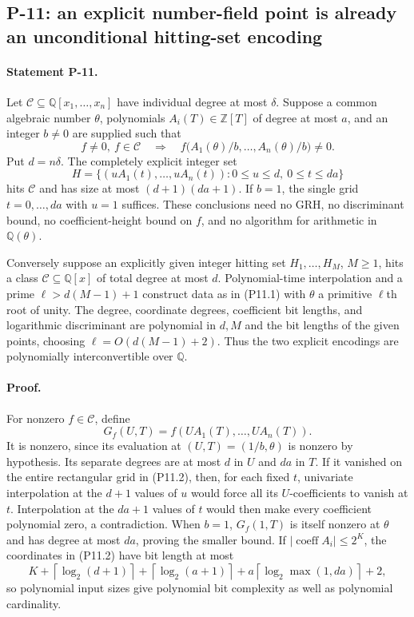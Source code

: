 \documentclass[11pt,a4paper]{article}
\theoremstyle{definition}\newtheorem{definition}{Definition}
\begin{document}
\subsection{P-11: an explicit number-field point is already an unconditional hitting-set encoding}
\paragraph{Statement P-11.}
Let $\mathcal C\subseteq\mathbb Q[x_1,\ldots,x_n]$ have individual degree at most $\delta$. Suppose a common algebraic number $\theta$, polynomials $A_i(T)\in\mathbb Z[T]$ of degree at most $a$, and an integer $b\ne0$ are supplied such that
\[
 f\ne0,\ f\in\mathcal C\quad\Longrightarrow\quad
 f\bigl(A_1(\theta)/b,\ldots,A_n(\theta)/b\bigr)\ne0.
 \tag{P11.1}
\]
Put $d=n\delta$. The completely explicit integer set
\[
 H=\{(uA_1(t),\ldots,uA_n(t)):
        0\le u\le d,\ 0\le t\le da\}
 \tag{P11.2}
\]
hits $\mathcal C$ and has size at most $(d+1)(da+1)$. If $b=1$, the single grid $t=0,\ldots,da$ with $u=1$ suffices. These conclusions need no GRH, no discriminant bound, no coefficient-height bound on $f$, and no algorithm for arithmetic in $\mathbb Q(\theta)$.

Conversely suppose an explicitly given integer hitting set $H_1,\ldots,H_M$, $M\ge1$, hits a class $\mathcal C\subseteq\mathbb Q[x]$ of total degree at most $d$. Polynomial-time interpolation and a prime $\ell>d(M-1)+1$ construct data as in (P11.1) with $\theta$ a primitive $\ell$th root of unity. The degree, coordinate degrees, coefficient bit lengths, and logarithmic discriminant are polynomial in $d,M$ and the bit lengths of the given points, choosing $\ell=O(d(M-1)+2)$. Thus the two explicit encodings are polynomially interconvertible over $\mathbb Q$.
\paragraph{Proof.}
For nonzero $f\in\mathcal C$, define
\[
 G_f(U,T)=f(UA_1(T),\ldots,UA_n(T)).
\]
It is nonzero, since its evaluation at $(U,T)=(1/b,\theta)$ is nonzero by hypothesis. Its separate degrees are at most $d$ in $U$ and $da$ in $T$. If it vanished on the entire rectangular grid in (P11.2), then, for each fixed $t$, univariate interpolation at the $d+1$ values of $u$ would force all its $U$-coefficients to vanish at $t$. Interpolation at the $da+1$ values of $t$ would then make every coefficient polynomial zero, a contradiction. When $b=1$, $G_f(1,T)$ is itself nonzero at $\theta$ and has degree at most $da$, proving the smaller bound. If $|\operatorname{coeff} A_i|\le2^K$, the coordinates in (P11.2) have bit length at most
\[
 K+\left\lceil\log_2(d+1)\right\rceil
  +\left\lceil\log_2(a+1)\right\rceil
  +a\left\lceil\log_2\max(1,da)\right\rceil+2,
\]
so polynomial input sizes give polynomial bit complexity as well as polynomial cardinality.
\end{document}
